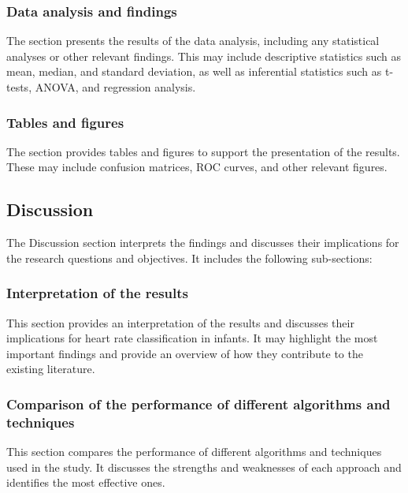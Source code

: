\subsubsection{Data analysis and findings}\label{sec:dataanalysisandfindings}

The section presents the results of the data analysis, including any statistical analyses or other relevant findings. This may include descriptive statistics such as mean, median, and standard deviation, as well as inferential statistics such as t-tests, ANOVA, and regression analysis.

\subsubsection{Tables and figures}\label{sec:tablesandfigures}

The section provides tables and figures to support the presentation of the results. These may include confusion matrices, ROC curves, and other relevant figures.

\subsection{Discussion}\label{sec:discussion}

The Discussion section interprets the findings and discusses their implications for the research questions and objectives. It includes the following sub-sections:

\subsubsection{Interpretation of the results}\label{sec:interpretationoftheresults}

This section provides an interpretation of the results and discusses their implications for heart rate classification in infants. It may highlight the most important findings and provide an overview of how they contribute to the existing literature.

\subsubsection{Comparison of the performance of different algorithms and techniques}\label{sec:comparisonoftheperformanceofdifferentalgorithmsandtechniques}

This section compares the performance of different algorithms and techniques used in the study. It discusses the strengths and weaknesses of each approach and identifies the most effective ones.


